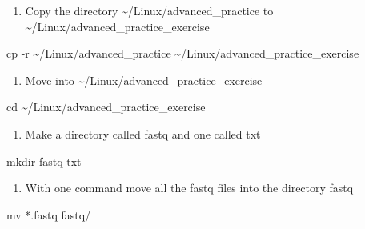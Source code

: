 \documentclass[
  letterpaper,
  DIV=11,
  numbers=noendperiod]{scrreprt}
\newenvironment{Shaded}{\begin{snugshade}}{\end{snugshade}}
\newcommand{\AttributeTok}[1]{\textcolor[rgb]{0.40,0.45,0.13}{#1}}
\newcommand{\BuiltInTok}[1]{\textcolor[rgb]{0.00,0.23,0.31}{#1}}
\newcommand{\FunctionTok}[1]{\textcolor[rgb]{0.28,0.35,0.67}{#1}}
\newcommand{\NormalTok}[1]{\textcolor[rgb]{0.00,0.23,0.31}{#1}}
\newcommand{\PreprocessorTok}[1]{\textcolor[rgb]{0.68,0.00,0.00}{#1}}
\providecommand{\tightlist}{%
  \setlength{\itemsep}{0pt}\setlength{\parskip}{0pt}}\usepackage{longtable,booktabs,array}
\begin{document}
\begin{enumerate}
\def\labelenumi{\arabic{enumi}.}
\tightlist
\item
  Copy the directory \textasciitilde/Linux/advanced\_practice to
  \textasciitilde/Linux/advanced\_practice\_exercise
\end{enumerate}

\begin{Shaded}
\begin{Highlighting}[]
\FunctionTok{cp} \AttributeTok{{-}r}\NormalTok{ \textasciitilde{}/Linux/advanced\_practice \textasciitilde{}/Linux/advanced\_practice\_exercise}
\end{Highlighting}
\end{Shaded}

\begin{enumerate}
\def\labelenumi{\arabic{enumi}.}
\setcounter{enumi}{1}
\tightlist
\item
  Move into \textasciitilde/Linux/advanced\_practice\_exercise
\end{enumerate}

\begin{Shaded}
\begin{Highlighting}[]
\BuiltInTok{cd}\NormalTok{ \textasciitilde{}/Linux/advanced\_practice\_exercise}
\end{Highlighting}
\end{Shaded}

\begin{enumerate}
\def\labelenumi{\arabic{enumi}.}
\setcounter{enumi}{2}
\tightlist
\item
  Make a directory called fastq and one called txt
\end{enumerate}

\begin{Shaded}
\begin{Highlighting}[]
\FunctionTok{mkdir}\NormalTok{ fastq txt}
\end{Highlighting}
\end{Shaded}

\begin{enumerate}
\def\labelenumi{\arabic{enumi}.}
\setcounter{enumi}{3}
\tightlist
\item
  With one command move all the fastq files into the directory fastq
\end{enumerate}

\begin{Shaded}
\begin{Highlighting}[]
\FunctionTok{mv} \PreprocessorTok{*}\NormalTok{.fastq fastq/}
\end{Highlighting}
\end{Shaded}
\end{document}
